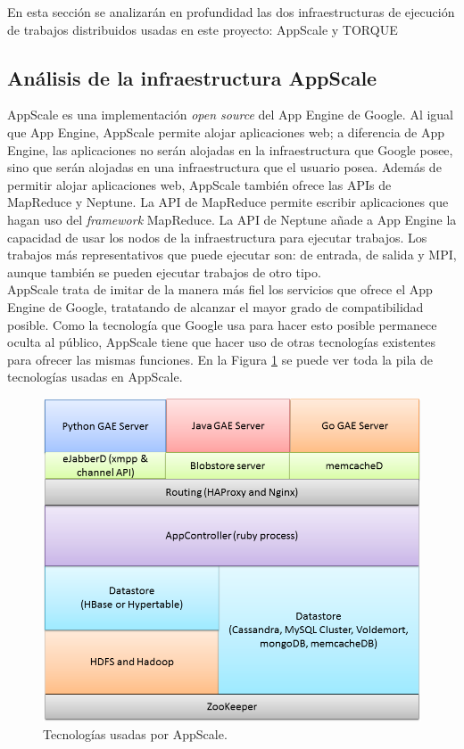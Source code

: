En esta sección se analizarán en profundidad las dos infraestructuras de ejecución de trabajos distribuidos usadas en este proyecto: AppScale y TORQUE


\subsection{Análisis de la infraestructura AppScale}

AppScale es una implementación \emph{open source} del App Engine de Google. Al igual que App Engine, AppScale permite alojar aplicaciones web; a diferencia de App Engine, las aplicaciones no serán alojadas en la infraestructura que Google posee, sino que serán alojadas en una infraestructura que el usuario posea. Además de permitir alojar aplicaciones web, AppScale también ofrece las APIs de MapReduce y Neptune. La API de MapReduce permite escribir aplicaciones que hagan uso del \emph{framework} MapReduce. La API de Neptune añade a App Engine la capacidad de usar los nodos de la infraestructura para ejecutar trabajos. Los trabajos más representativos que puede ejecutar son: de entrada, de salida y MPI, aunque también se pueden ejecutar trabajos de otro tipo. \\

AppScale trata de imitar de la manera más fiel los servicios que ofrece el App Engine de Google, tratatando de alcanzar el mayor grado de compatibilidad posible. Como la tecnología que Google usa para hacer esto posible permanece oculta al público, AppScale tiene que hacer uso de otras tecnologías existentes para ofrecer las mismas funciones. En la Figura \ref{figure:tecnologias-appscale} se puede ver toda la pila de tecnologías usadas en AppScale.

\begin{figure} [!htbp]
  \centering
  \includegraphics[width=13.5cm]{imagenes/AppScale_Stack.png}
  \caption{Tecnologías usadas por AppScale.}
\label{figure:tecnologias-appscale}
\end{figure}

